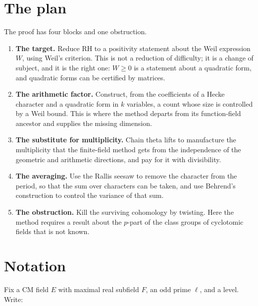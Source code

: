 \section{The plan}The proof has four blocks and one obstruction.

\begin{enumerate}
\item \textbf{The target.} Reduce RH to a positivity statement about the Weil
expression $W$, using Weil's criterion. This is not a reduction of difficulty;
it is a change of subject, and it is the right one: $W \ge 0$ is a statement
about a quadratic form, and quadratic forms can be certified by matrices.

\item \textbf{The arithmetic factor.} Construct, from the coefficients of a
Hecke character and a quadratic form in $k$ variables, a count whose size is
controlled by a Weil bound. This is where the method departs from its
function-field ancestor and supplies the missing dimension.

\item \textbf{The substitute for multiplicity.} Chain theta lifts to
manufacture the multiplicity that the finite-field method gets from the
independence of the geometric and arithmetic directions, and pay for it with
divisibility.

\item \textbf{The averaging.} Use the Rallis seesaw to remove the character
from the period, so that the sum over characters can be taken, and use
Behrend's construction to control the variance of that sum.

\item \textbf{The obstruction.} Kill the surviving cohomology by twisting.
Here the method requires a result about the $p$-part of the class groups of
cyclotomic fields that is not known.
\end{enumerate}

\section{Notation}Fix a CM field $E$ with maximal real subfield $F$, an odd prime $\ell$, and
a level. Write:

